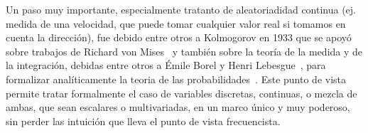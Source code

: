 {Un  paso  muy  importante,  especialmente tratanto  de  aleatoriadidad  continua
(ej. medida de una velocidad, que puede tomar cualquier valor real si tomamos en
cuenta  la direcci\'on),  fue debido  entre otros  a Kolmogorov  en 1933  que se
apoy\'o sobre  trabajos de Richard  von Mises~\cite{Mis32} y tambi\'en  sobre la
teor\'ia de la medida y de la integraci\'on, debidas entre otros a \'Emile Borel
y  Henri  Lebesgue~\cite{Bor98, Bor09,  Leb04,  Leb18,  Hal50}, para  formalizar
anal\'iticamente   la  teoria   de  las   probabilidades~\cite{Kol56,  BarNov78,
JacPro03}. Este punto  de vista permite tratar formalmente  el caso de variables
discretas, continuas, o mezcla de  ambas, que sean escalares o multivariadas, en
un marco \'unico  y muy poderoso, sin perder las intuici\'on  que lleva el punto
de vista frecuencista.

}